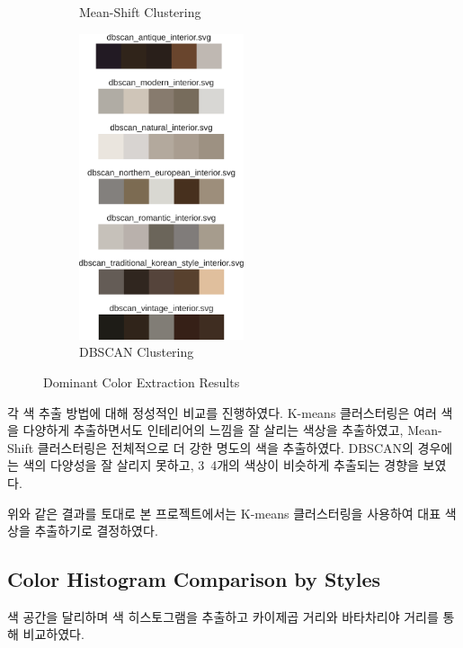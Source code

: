 \documentclass[11pt]{article}
\begin{document}
\begin{figure}[htbp]
\begin{subfigure}[b]{0.3\textwidth}
        \caption{Mean-Shift Clustering}
        \label{fig:meanshift}
    \end{subfigure}
    \begin{subfigure}[b]{0.3\textwidth}
        \centering
        \includegraphics[height=9cm]{figures/dbscan_dominant_color.pdf}
        \caption{DBSCAN Clustering}
        \label{fig:dbscan}
    \end{subfigure}
    \caption{Dominant Color Extraction Results}
    \label{fig:dominant_color_extraction}
\end{figure}

각 색 추출 방법에 대해 정성적인 비교를 진행하였다. K-means 클러스터링은 여러 색을 다양하게 추출하면서도 인테리어의 느낌을 잘 살리는 색상을 추출하였고, Mean-Shift 클러스터링은 전체적으로 더 강한 명도의 색을 추출하였다.
DBSCAN의 경우에는 색의 다양성을 잘 살리지 못하고, 3~4개의 색상이 비슷하게 추출되는 경향을 보였다.

위와 같은 결과를 토대로 본 프로젝트에서는 K-means 클러스터링을 사용하여 대표 색상을 추출하기로 결정하였다.
\subsection{Color Histogram Comparison by Styles}
색 공간을 달리하며 색 히스토그램을 추출하고 카이제곱 거리와 바타차리야 거리를 통해 비교하였다.
\end{document}
